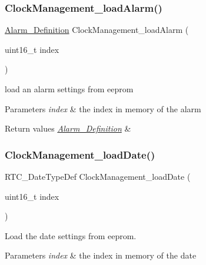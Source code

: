 \subsubsection{\texorpdfstring{Clock\+Management\+\_\+load\+Alarm()}{ClockManagement\_loadAlarm()}}
{\footnotesize\ttfamily \hyperlink{struct_alarm___definition}{Alarm\+\_\+\+Definition} Clock\+Management\+\_\+load\+Alarm (\begin{DoxyParamCaption}\item[{uint16\+\_\+t}]{index }\end{DoxyParamCaption})}



load an alarm settings from eeprom 


\begin{DoxyParams}{Parameters}
{\em index} & the index in memory of the alarm \\
\hline
\end{DoxyParams}

\begin{DoxyRetVals}{Return values}
{\em \hyperlink{struct_alarm___definition}{Alarm\+\_\+\+Definition}} & \\
\hline
\end{DoxyRetVals}
\mbox{\label{group___clock___management_ga7bc7fe03cb9b82c9d7bc38ece99b7eb1}} 
\subsubsection{\texorpdfstring{Clock\+Management\+\_\+load\+Date()}{ClockManagement\_loadDate()}}
{\footnotesize\ttfamily R\+T\+C\+\_\+\+Date\+Type\+Def Clock\+Management\+\_\+load\+Date (\begin{DoxyParamCaption}\item[{uint16\+\_\+t}]{index }\end{DoxyParamCaption})}



Load the date settings from eeprom. 


\begin{DoxyParams}{Parameters}
{\em index} & the index in memory of the date \\
\hline
\end{DoxyParams}

